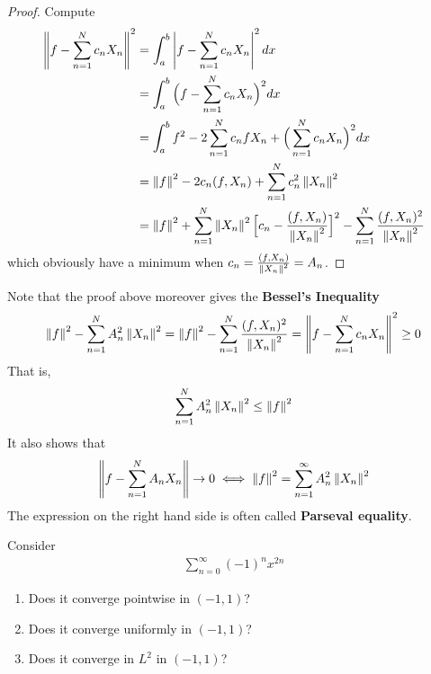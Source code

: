 \documentclass{report}
\begin{document}
\begin{proof}
Compute 
\begin{align*}
  \left\| f- \sum_{n=1}^N c_n X_n \right\|^2&= \int_a^b \left|f- \sum_{n=1}^N c_n X_n\right|^2 dx\\
  &=\int_a^b \Big(f- \sum_{n=1}^N c_n X_n\Big)^2dx  \\
  &=\int_a^b f^2 - 2\sum_{n=1}^N c_n f X_n + \Big(\sum_{n=1}^N c_n X_n  \Big)^2 dx \\
  &= \left\| f \right\|^2 - 2c_n (f,X_n) + \sum_{n=1}^N c_n^2 \left\| X_n \right\|^2 \\
  &=\left\| f \right\|^2 + \sum_{n=1}^N \left\| X_n \right\|^2 \Big[ c_n - \frac{(f,X_n)}{\left\| X_n \right\|^2} \Big]^2  - \sum_{n=1}^N \frac{(f,X_n)^2}{\left\| X_n \right\|^2}
\end{align*}
which obviously have a minimum when $c_n= \frac{(f,X_n)}{\left\| X_n \right\|^2}=A_n$. 
\end{proof}
\begin{mdframed}
Note that the proof above moreover gives the \textbf{Bessel's Inequality} 
\begin{align*}
\left\| f \right\|^2- \sum_{n=1}^N A_n^2 \left\| X_n \right\|^2 =\left\| f \right\|^2 - \sum_{n=1}^N \frac{(f,X_n)^2}{\left\| X_n \right\|^2} = \left\| f- \sum_{n=1}^N c_n X_n \right\|^2 \geq 0
\end{align*}
That is, 
\begin{align*}
\sum_{n=1}^N A_n^2 \left\| X_n \right\|^2 \leq \left\| f \right\|^2
\end{align*}
It also shows that 
\begin{align*}
  \left\| f-\sum_{n=1}^N A_nX_n  \right\| \to 0\iff \left\| f \right\|^2=\sum_{n=1}^\infty A_n^2 \left\| X_n \right\|^2
\end{align*}
The expression on the right hand side is often called \textbf{Parseval equality}. 
\end{mdframed}
\begin{question}{}{}
Consider 
\begin{align*}
\sum_{n=0}^{\infty}(-1)^n x^{2n}
\end{align*}
\begin{enumerate}[label=(\alph*)]
  \item Does it converge pointwise in $(-1,1)$?  
  \item Does it converge uniformly in $(-1,1)$? 
  \item Does it converge in $L^2$ in $(-1,1)$? 
\end{enumerate}
\end{question}
\end{document}

